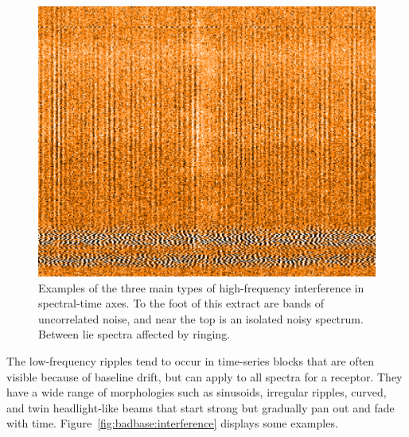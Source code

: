 \documentclass[final,authoryear,5p,times,twocolumn]{elsarticle}
\begin{document}
\begin{figure}[!ht]
\includegraphics[width=\columnwidth]{high_freq_three_types.png}
\caption{Examples of the three main types of high-frequency
  interference in spectral-time axes.  To the foot of this extract
  are bands of uncorrelated noise, and near the top is an isolated
  noisy spectrum.  Between lie spectra affected by ringing.}
\label{fig:badbase:highfreq}
\end{figure}

The low-frequency ripples tend to occur in time-series blocks that are
often visible because of baseline drift, but can apply to all spectra
for a receptor.  They have a wide range of morphologies such as
sinusoids, irregular ripples, curved, and twin headlight-like beams
that start strong but gradually pan out and fade with time.
Figure~\ref{fig:badbase:interference} displays some examples.
\end{document}
